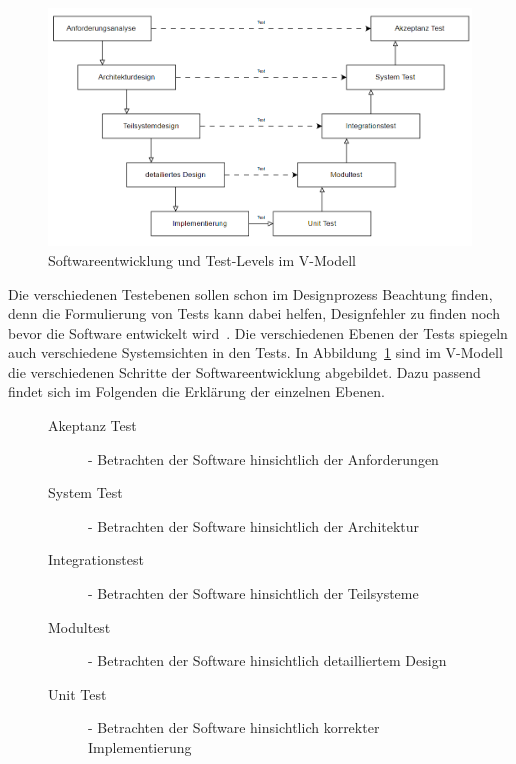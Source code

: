 \begin{figure}[h!]
    \centering
    \includegraphics[width=\textwidth,height=\textheight,keepaspectratio]{img/vmodell}
    \caption{Softwareentwicklung und Test-Levels im V-Modell \cite[vgl. Figure 1.2]{software-testing}}
    \label{vmodelltest}
\end{figure}

Die verschiedenen Testebenen sollen schon im Designprozess Beachtung finden, denn die Formulierung von Tests kann dabei helfen, Designfehler zu finden
noch bevor die Software entwickelt wird~\cite[vgl. 1.1.1]{software-testing-ana}.
Die verschiedenen Ebenen der Tests spiegeln auch verschiedene Systemsichten in den Tests.
In Abbildung~\ref{vmodelltest} sind im V-Modell die verschiedenen Schritte der Softwareentwicklung abgebildet.
Dazu passend findet sich im Folgenden die Erklärung der einzelnen Ebenen.

\newpage
\begin{figure}[h!]
    \begin{description}
        \item[Akeptanz Test] - Betrachten der Software hinsichtlich der Anforderungen
        \item[System Test] - Betrachten der Software hinsichtlich der Architektur
        \item[Integrationstest] - Betrachten der Software hinsichtlich der Teilsysteme
        \item[Modultest] - Betrachten der Software hinsichtlich detailliertem Design
        \item[Unit Test] - Betrachten der Software hinsichtlich korrekter Implementierung
    \end{description}\cite[vgl. 1.1.1]{software-testing}
\end{figure}

